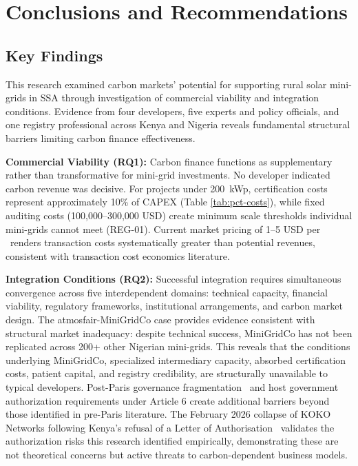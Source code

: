 \section{Conclusions and Recommendations}
\label{sec:conc}

\subsection{Key Findings}
This research examined carbon markets' potential for supporting rural solar mini-grids in SSA through investigation of commercial viability and integration conditions. Evidence from four developers, five experts and policy officials, and one registry professional across Kenya and Nigeria reveals fundamental structural barriers limiting carbon finance effectiveness.

\textbf{Commercial Viability (RQ1):} Carbon finance functions as supplementary rather than transformative for mini-grid investments. No developer indicated carbon revenue was decisive. For projects under 200~kWp, certification costs represent approximately 10\% of CAPEX (Table \ref{tab:pct-costs}), while fixed auditing costs (100,000--300,000 USD) create minimum scale thresholds individual mini-grids cannot meet (REG-01). Current market pricing of 1--5 USD per \tcooe\ renders transaction costs systematically greater than potential revenues, consistent with transaction cost economics literature.~\cite{michaelowa2005,bellassen}

\textbf{Integration Conditions (RQ2):} Successful integration requires simultaneous convergence across five interdependent domains: technical capacity, financial viability, regulatory frameworks, institutional arrangements, and carbon market design. The atmosfair-MiniGridCo case provides evidence consistent with structural market inadequacy: despite technical success, MiniGridCo has not been replicated across 200+ other Nigerian mini-grids. This reveals that the conditions underlying MiniGridCo, specialized intermediary capacity, absorbed certification costs, patient capital, and registry credibility, are structurally unavailable to typical developers. Post-Paris governance fragmentation~\cite{ahonen-governance} and host government authorization requirements under Article 6 create additional barriers beyond those identified in pre-Paris literature. The February 2026 collapse of KOKO Networks following Kenya's refusal of a Letter of Authorisation~\cite{koko-disrupt} validates the authorization risks this research identified empirically, demonstrating these are not theoretical concerns but active threats to carbon-dependent business models.

